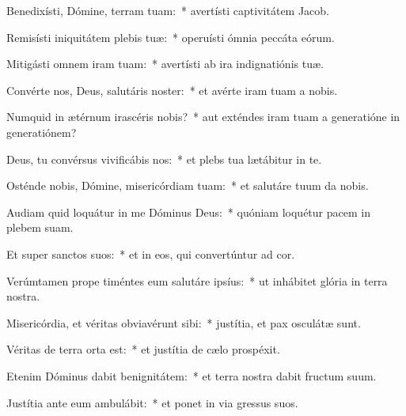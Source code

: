 \item Benedixísti, Dómine, terram tuam:~* avertísti captivitátem Jacob.

\item Remisísti iniquitátem plebis tuæ:~* operuísti ómnia peccáta eórum.

\item Mitigásti omnem iram tuam:~* avertísti ab ira indignatiónis tuæ.

\item Convérte nos, Deus, salutáris noster:~* et avérte iram tuam a nobis.

\item Numquid in ætérnum irascéris nobis?~* aut exténdes iram tuam a generatióne in generatiónem?

\item Deus, tu convérsus vivificábis nos:~* et plebs tua lætábitur in te.

\item Osténde nobis, Dómine, misericórdiam tuam:~* et salutáre tuum da nobis.

\item Audiam quid loquátur in me Dóminus Deus:~* quóniam loquétur pacem in plebem suam.

\item Et super sanctos suos:~* et in eos, qui convertúntur ad cor.

\item Verúmtamen prope timéntes eum salutáre ipsíus:~* ut inhábitet glória in terra nostra.

\item Misericórdia, et véritas obviavérunt sibi:~* justítia, et pax osculátæ sunt.

\item Véritas de terra orta est:~* et justítia de cælo prospéxit.

\item Etenim Dóminus dabit benignitátem:~* et terra nostra dabit fructum suum.

\item Justítia ante eum ambulábit:~* et ponet in via gressus suos.
